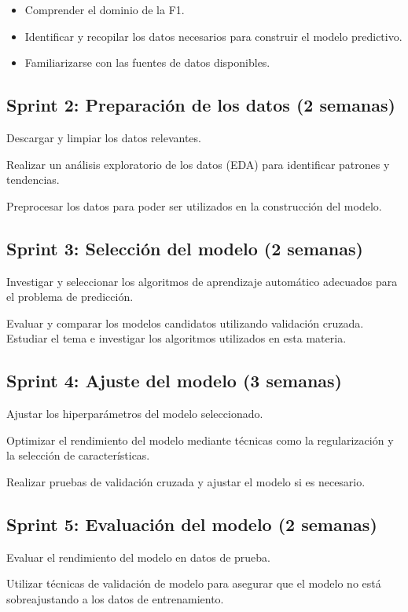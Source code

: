 \begin{itemize}
\item
Comprender el dominio de la F1.
\item
Identificar y recopilar los datos necesarios para construir el modelo predictivo.
\item
Familiarizarse con las fuentes de datos disponibles.
\end{itemize}


\subsection{Sprint 2: Preparación de los datos (2 semanas)}

Descargar y limpiar los datos relevantes.

Realizar un análisis exploratorio de los datos (EDA) para identificar patrones y tendencias.

Preprocesar los datos para poder ser utilizados en la construcción del modelo.

\subsection{Sprint 3: Selección del modelo (2 semanas)}

Investigar y seleccionar los algoritmos de aprendizaje automático adecuados para el problema de predicción.

Evaluar y comparar los modelos candidatos utilizando validación cruzada.
Estudiar el tema e investigar los algoritmos utilizados en esta materia.

\subsection{Sprint 4: Ajuste del modelo (3 semanas)}

Ajustar los hiperparámetros del modelo seleccionado.

Optimizar el rendimiento del modelo mediante técnicas como la regularización y la selección de características.

Realizar pruebas de validación cruzada y ajustar el modelo si es necesario.

\subsection{Sprint 5: Evaluación del modelo (2 semanas)}
Evaluar el rendimiento del modelo en datos de prueba.

Utilizar técnicas de validación de modelo para asegurar que el modelo no está sobreajustando a los datos de entrenamiento.

